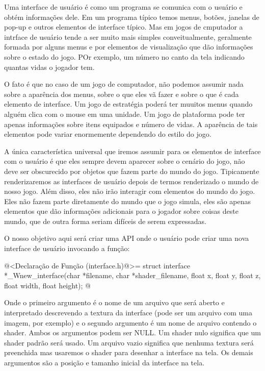 
Uma interface de usuário é como um programa se comunica com o usuário
e obtém informações dele. Em um programa típico temos menus, botões,
janelas de pop-up e outros elementos de interface típico. Mas em jogos
de cmputador a intrface de usuário tende a ser muito mais simples
conveitualmente, geralmente formada por alguns menus e por elementos
de visualização que dão informações sobre o estado do jogo. POr
exemplo, um número no canto da tela indicando quantas vidas o jogador
tem.

O fato é que no caso de um jogo de computador, não podemos assumir
nada sobre a aparência dos menus, sobre o que eles vã fazer e sobre o
que é cada elemento de interface. Um jogo de estratégia poderá ter
muuitos menus quando alguém clica com o mouse em uma unidade. Um jogo
de plataforma pode ter apenas informações sobre itens equipados e
número de vidas. A aparência de tais elementos pode variar enormemente
dependendo do estilo do jogo.

A única característica universal que iremos assumir para os elementos
de interface com o usuário é que eles sempre devem aparecer sobre o
cenário do jogo, não deve ser obscurecido por objetos que fazem parte
do mundo do jogo. Tipicamente renderizaremos as interfaces de usuário
depois de termos renderizado o mundo de nosso jogo. Além disso, eles
não irão interagir com elementos do mundo do jogo. Eles não fazem
parte diretamente do mundo que o jogo simula, eles são apenas
elementos que dão informações adicionais para o jogador sobre coisas
deste mundo, que de outra forma seriam difíceis de serem expressadas.

O nosso objetivo aqui será criar uma API onde o usuário pode criar uma
nova interface de usuário invocando a função:

\iniciocodigo
@<Declaração de Função (interface.h)@>=
struct interface *_Wnew_interface(char *filename, char *shader_filename,
                                  float x, float y, float z, float width,
                                  float height);
@
\fimcodigo

Onde o primeiro argumento é o nome de um arquivo que será aberto e
interpretado descrevendo a textura da interface (pode ser um arquivo
com uma imagem, por exemplo) e o segundo argumento é um nome de
arquivo contendo o shader. Ambos os argumentos podem ser NULL. Um
shader nulo significa que um shader padrão será usado. Um arquivo
vazio significa que nenhuma textura será preenchida mas usaremos o
shader para desenhar a interface na tela. Os demais argumentos são a
posição e tamanho inicial da interface na tela.

